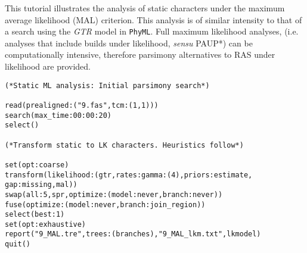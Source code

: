 This tutorial illustrates the analysis of static characters under the maximum average likelihood (MAL) criterion.  
This analysis is of similar intensity to that of a search using the \emph{GTR} model in \texttt{PhyML}.  
Full maximum likelihood analyses, (i.e. analyses that include builds under likelihood, \textit{sensu} PAUP*) 
can be computationally intensive, therefore parsimony alternatives to RAS under likelihood are provided. 

\begin{verbatim}
(*Static ML analysis: Initial parsimony search*)

read(prealigned:("9.fas",tcm:(1,1)))
search(max_time:00:00:20)
select()

(*Transform static to LK characters. Heuristics follow*)

set(opt:coarse)
transform(likelihood:(gtr,rates:gamma:(4),priors:estimate, 
gap:missing,mal))
swap(all:5,spr,optimize:(model:never,branch:never))
fuse(optimize:(model:never,branch:join_region))
select(best:1)
set(opt:exhaustive)
report("9_MAL.tre",trees:(branches),"9_MAL_lkm.txt",lkmodel)
quit()
\end{verbatim}

